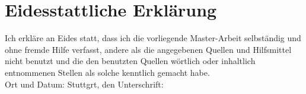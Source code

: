 \chapter*{Eidesstattliche Erklärung}
Ich erkläre an Eides statt, dass ich die vorliegende Master-Arbeit selbständig und ohne fremde Hilfe verfasst, andere als die angegebenen Quellen und Hilfsmittel nicht benutzt und die den benutzten Quellen wörtlich oder inhaltlich entnommenen Stellen als solche kenntlich gemacht habe.
\\[2.5cm]
Ort und Datum: Stuttgrt, den \hrulefill\enspace Unterschrift: \hrulefill